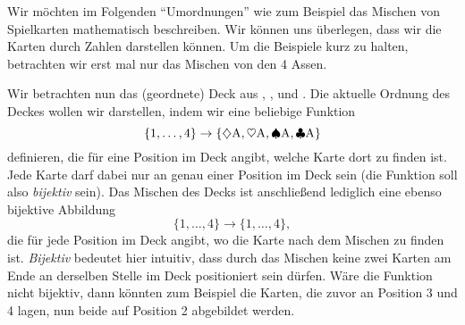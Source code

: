 \documentclass[../../main.tex]{subfiles}
\begin{document}
Wir möchten im Folgenden \enquote{Umordnungen} wie zum Beispiel das Mischen von Spielkarten mathematisch beschreiben. Wir können uns überlegen, dass wir die Karten durch Zahlen darstellen können. Um die Beispiele kurz zu halten, betrachten wir erst mal nur das Mischen von den 4 Assen.
\begin{example}{}
    Wir betrachten nun das (geordnete) Deck aus \AceDiamond{}, \AceHeart{}, \AceSpade{} und \AceClub. Die aktuelle Ordnung des Deckes wollen wir darstellen, indem wir eine beliebige Funktion
    \[\{1,\dots, 4\} \to \{\diamondsuit\text{A},\heartsuit\text{A},\spadesuit\text{A},\clubsuit\text{A}\}\]
    definieren, die für eine Position im Deck angibt, welche Karte dort zu finden ist. Jede Karte darf dabei nur an genau einer Position im Deck sein (die Funktion soll also \emph{bijektiv} sein). Das Mischen des Decks ist anschließend lediglich eine ebenso bijektive Abbildung
    \[\{1,\dots, 4\} \to \{1,\dots,4\},\]
    die für jede Position im Deck angibt, wo die Karte nach dem Mischen zu finden ist. \emph{Bijektiv} bedeutet hier intuitiv, dass durch das Mischen keine zwei Karten am Ende an derselben Stelle im Deck positioniert sein dürfen. Wäre die Funktion nicht bijektiv, dann könnten zum Beispiel die Karten, die zuvor an Position 3 und 4 lagen, nun beide auf Position 2 abgebildet werden. 
    

\end{example}
\end{document}
